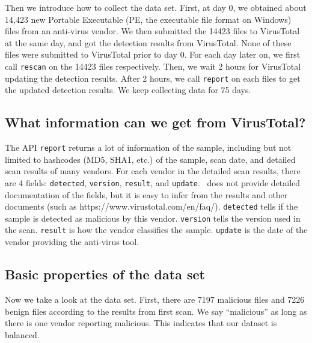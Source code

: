 Then we introduce how to collect the data set. 
First, at day 0, we obtained about 14,423 new Portable Executable (PE, the executable file format on Windows) files from an anti-virus vendor. 
We then submitted the 14423 files to VirusTotal at the same day, and got the detection results from VirusTotal. 
None of these files were submitted to VirusTotal prior to day 0.
For each day later on, we first call \texttt{rescan} on the 14423 files respectively. Then, we wait 2 hours for VirusTotal updating the detection results. 
After 2 hours, we call \texttt{report} on each files to get the updated detection results. 
We keep collecting data for 75 days. 

\subsection{What information can we get from VirusTotal?}%

The API \texttt{report} returns a lot of information of the sample, including but not limited to hashcodes (MD5, SHA1, etc.) of the sample, scan date, and detailed scan results of many vendors. For each vendor in the detailed scan results, there are 4 fields: \texttt{detected}, \texttt{version}, \texttt{result}, and \texttt{update}. \vt\ does not provide detailed documentation of the fields, but it is easy to infer from the results and other documents (such as https://www.virustotal.com/en/faq/). \texttt{detected} tells if the sample is detected as malicious by this vendor. \texttt{version} tells the version used in the scan. \texttt{result} is how the vendor classifies the sample. \texttt{update} is the date of the vendor providing the anti-virus tool.

\subsection{Basic properties of the data set}

Now we take a look at the data set. First, there are 7197 malicious files and 7226 benign files according to the results from first scan. We say ``malicious'' as long as there is one vendor reporting malicious. This indicates that our dataset is balanced.

